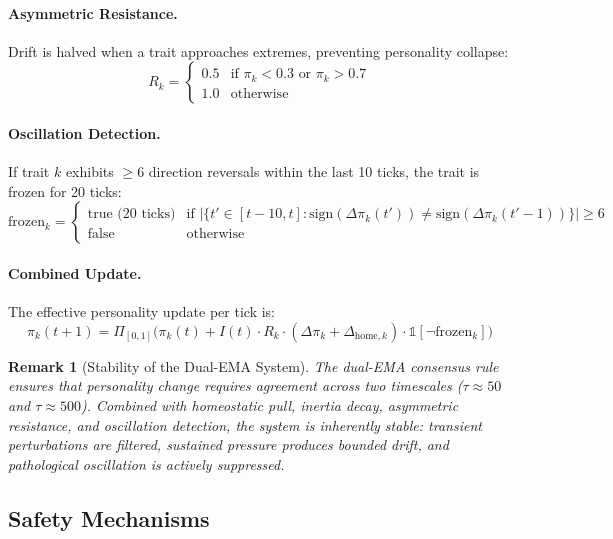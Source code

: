 \documentclass[11pt]{article}
\newtheorem{remark}[theorem]{Remark}
\begin{document}
\paragraph{Asymmetric Resistance.}
Drift is halved when a trait approaches extremes, preventing personality collapse:
\begin{equation}
R_k = \begin{cases} 0.5 & \text{if } \pi_k < 0.3 \text{ or } \pi_k > 0.7 \\ 1.0 & \text{otherwise} \end{cases}
\end{equation}

\paragraph{Oscillation Detection.}
If trait $k$ exhibits $\geq 6$ direction reversals within the last 10 ticks, the trait is frozen for 20 ticks:
\begin{equation}
\text{frozen}_k = \begin{cases} \text{true (20 ticks)} & \text{if } |\{t' \in [t-10, t] : \text{sign}(\Delta\pi_k(t')) \neq \text{sign}(\Delta\pi_k(t'-1))\}| \geq 6 \\ \text{false} & \text{otherwise} \end{cases}
\end{equation}

\paragraph{Combined Update.}
The effective personality update per tick is:
\begin{equation}
\pi_k(t+1) = \Pi_{[0,1]}\bigl(\pi_k(t) + I(t) \cdot R_k \cdot (\Delta\pi_k + \Delta_{\text{home},k}) \cdot \mathbb{1}[\neg\text{frozen}_k]\bigr)
\end{equation}

\begin{remark}[Stability of the Dual-EMA System]
The dual-EMA consensus rule ensures that personality change requires agreement across two timescales ($\tau \approx 50$ and $\tau \approx 500$). Combined with homeostatic pull, inertia decay, asymmetric resistance, and oscillation detection, the system is inherently stable: transient perturbations are filtered, sustained pressure produces bounded drift, and pathological oscillation is actively suppressed.
\end{remark}

\subsection{Safety Mechanisms}
\label{sec:safety}
\end{document}
